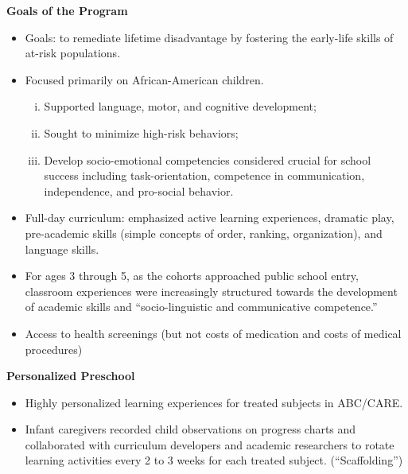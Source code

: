 \documentclass[static]{JJH-Beamer}
\begin{document}
\begin{frame}

\begin{center}
\textbf{Goals of the Program}
\end{center}

\begin{itemize}
\item Goals: to remediate lifetime disadvantage by fostering the early-life skills of at-risk populations.
\item Focused primarily on African-American children.
    \begin{enumerate}[(i)]
    \item Supported language, motor, and cognitive development;
    \item Sought to minimize high-risk behaviors;
    \item Develop socio-emotional competencies considered crucial for school success including task-orientation, competence in communication, independence, and pro-social behavior.
    \end{enumerate}
\end{itemize}

\end{frame}

\begin{frame}

\begin{itemize}
\item Full-day curriculum: emphasized active learning experiences, dramatic play, pre-academic skills (simple concepts of order, ranking, organization), and language skills.
\item For ages 3 through 5, as the cohorts approached public school entry, classroom experiences were increasingly structured towards the development of academic skills and ``socio-linguistic and communicative competence.''
\item Access to health screenings (but not costs of medication and costs of medical procedures)
\end{itemize}

\end{frame}

\begin{frame}

\begin{center}
\textbf{Personalized Preschool}
\end{center}
\begin{itemize}
\item Highly personalized learning experiences for treated subjects in ABC/CARE.
\item Infant caregivers recorded child observations on progress charts and collaborated with curriculum developers and academic researchers to rotate learning activities every 2 to 3 weeks for each treated subject. (``Scaffolding'')
\end{itemize}

\end{frame}
\end{document}
